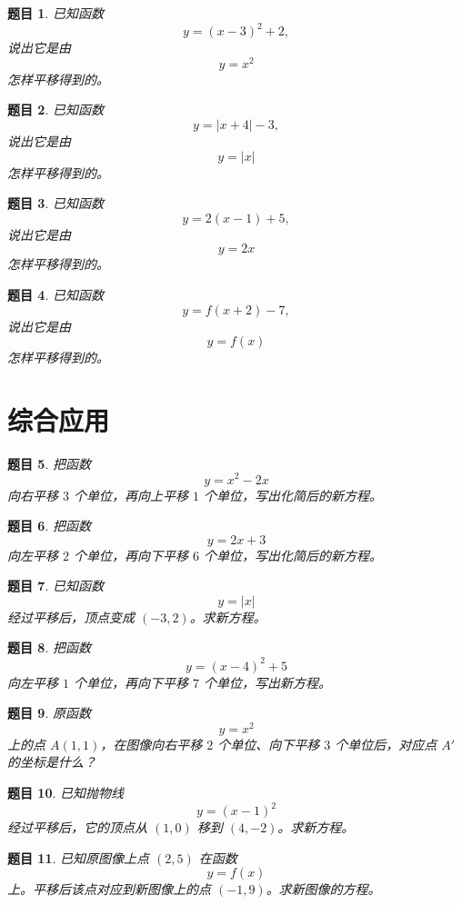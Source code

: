 \documentclass[11pt,a4paper,fontset=fandol]{ctexart}
\theoremstyle{formalexample}
\newtheorem{exercise}{题目}[section]
\begin{document}
\begin{exercise}
已知函数
\[
y=(x-3)^2+2,
\]
说出它是由
\[
y=x^2
\]
怎样平移得到的。
\end{exercise}

\begin{exercise}
已知函数
\[
y=|x+4|-3,
\]
说出它是由
\[
y=|x|
\]
怎样平移得到的。
\end{exercise}

\begin{exercise}
已知函数
\[
y=2(x-1)+5,
\]
说出它是由
\[
y=2x
\]
怎样平移得到的。
\end{exercise}

\begin{exercise}
已知函数
\[
y=f(x+2)-7,
\]
说出它是由
\[
y=f(x)
\]
怎样平移得到的。
\end{exercise}

\section{综合应用}

\begin{exercise}
把函数
\[
y=x^2-2x
\]
向右平移 $3$ 个单位，再向上平移 $1$ 个单位，写出化简后的新方程。
\end{exercise}

\begin{exercise}
把函数
\[
y=2x+3
\]
向左平移 $2$ 个单位，再向下平移 $6$ 个单位，写出化简后的新方程。
\end{exercise}

\begin{exercise}
已知函数
\[
y=|x|
\]
经过平移后，顶点变成 $(-3,2)$。求新方程。
\end{exercise}

\begin{exercise}
把函数
\[
y=(x-4)^2+5
\]
向左平移 $1$ 个单位，再向下平移 $7$ 个单位，写出新方程。
\end{exercise}

\begin{exercise}
原函数
\[
y=x^2
\]
上的点 $A(1,1)$，在图像向右平移 $2$ 个单位、向下平移 $3$ 个单位后，对应点 $A'$ 的坐标是什么？
\end{exercise}

\begin{exercise}
已知抛物线
\[
y=(x-1)^2
\]
经过平移后，它的顶点从 $(1,0)$ 移到 $(4,-2)$。求新方程。
\end{exercise}

\begin{exercise}
已知原图像上点 $(2,5)$ 在函数
\[
y=f(x)
\]
上。平移后该点对应到新图像上的点 $(-1,9)$。求新图像的方程。
\end{exercise}
\end{document}
